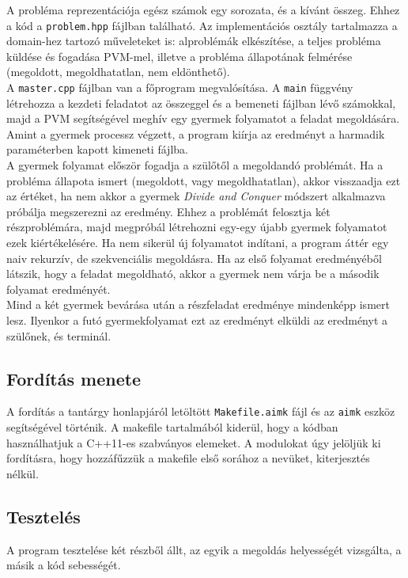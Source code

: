 \documentclass[12pt]{article}
\begin{document}
A probléma reprezentációja egész számok egy sorozata, és a kívánt összeg. Ehhez a kód a \verb|problem.hpp|
fájlban található. Az implementációs osztály tartalmazza a domain-hez tartozó műveleteket is:
alproblémák elkészítése, a teljes probléma küldése és fogadása PVM-mel, illetve a probléma állapotának
felmérése (megoldott, megoldhatatlan, nem eldönthető).
\\
A \verb|master.cpp| fájlban van a főprogram megvalósítása. A \verb|main| függvény létrehozza a kezdeti
feladatot az összeggel és a bemeneti fájlban lévő számokkal, majd a PVM segítségével meghív egy gyermek
folyamatot a feladat megoldására. Amint a gyermek processz végzett, a program kiírja az eredményt a
harmadik paraméterben kapott kimeneti fájlba.
\\
A gyermek folyamat először fogadja a szülőtől a megoldandó problémát. Ha a probléma állapota ismert
(megoldott, vagy megoldhatatlan), akkor visszaadja ezt az értéket, ha nem akkor a gyermek 
\textit{Divide and Conquer} módszert alkalmazva próbálja megszerezni az eredmény. Ehhez a problémát
felosztja két részproblémára, majd megpróbál létrehozni egy-egy újabb gyermek folyamatot ezek
kiértékelésére. Ha nem sikerül új folyamatot indítani, a program áttér egy naiv rekurzív, de szekvenciális
megoldásra. Ha az első folyamat eredményéből látszik, hogy a feladat megoldható, akkor a gyermek nem várja
be a második folyamat eredményét.
\\
Mind a két gyermek bevárása után a részfeladat eredménye mindenképp ismert lesz. Ilyenkor a futó gyermekfolyamat
ezt az eredményt elküldi az eredményt a szülőnek, és terminál.

\subsection{Fordítás menete}

A fordítás a tantárgy honlapjáról letöltött \verb|Makefile.aimk| fájl és az \verb|aimk| eszköz
segítségével történik. A makefile tartalmából kiderül, hogy a kódban használhatjuk a C++11-es
szabványos elemeket.
A modulokat úgy jelöljük ki fordításra, hogy hozzáfűzzük a makefile első sorához a nevüket,
kiterjesztés nélkül.

\subsection{Tesztelés}

A program tesztelése két részből állt, az egyik a megoldás helyességét vizsgálta, a másik
a kód sebességét.
\end{document}
